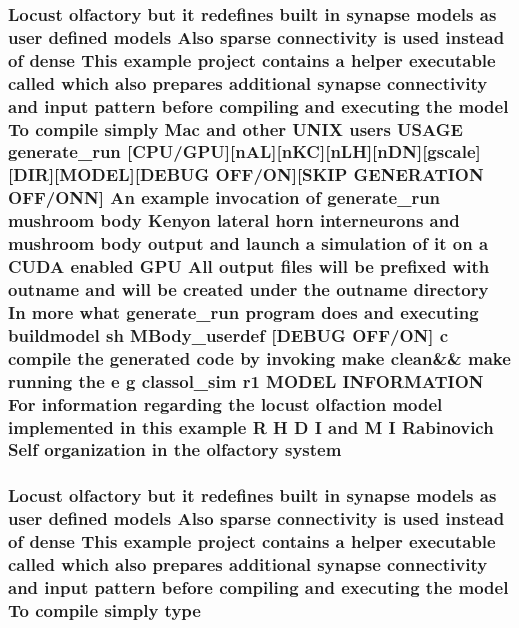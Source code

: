 \hypertarget{userproject_2MBody__userdef__project_2README_8txt_a8944a42451a985d439625b4a2ecdb611}{
\subsubsection[{system}]{\setlength{\rightskip}{0pt plus 5cm}Locust olfactory but {\bf it} redefines built {\bf in} synapse models as user defined models Also sparse connectivity {\bf is} used instead of dense This example {\bf project} contains a helper executable called which also prepares additional synapse connectivity and input pattern before compiling and executing the {\bf model} To compile simply Mac and other U\+N\+I\+X users U\+S\+A\+G\+E {\bf generate\+\_\+run} \mbox{[}{\bf C\+P\+U}/{\bf G\+P\+U}\mbox{]}\mbox{[}n\+A\+L\mbox{]}\mbox{[}n\+K\+C\mbox{]}\mbox{[}n\+L\+H\mbox{]}\mbox{[}n\+D\+N\mbox{]}\mbox{[}gscale\mbox{]}\mbox{[}D\+I\+R\mbox{]}\mbox{[}M\+O\+D\+E\+L\mbox{]}\mbox{[}D\+E\+B\+U\+G O\+F\+F/O\+N\mbox{]}\mbox{[}S\+K\+I\+P G\+E\+N\+E\+R\+A\+T\+I\+O\+N O\+F\+F/O\+N\+N\mbox{]} An example invocation of {\bf generate\+\_\+run} mushroom body Kenyon lateral horn {\bf interneurons} and mushroom body output and launch a simulation of {\bf it} on a C\+U\+D\+A enabled {\bf G\+P\+U} All output files will be prefixed {\bf with} outname and will be created under the outname {\bf directory} In more what {\bf generate\+\_\+run} program does and executing buildmodel sh M\+Body\+\_\+userdef \mbox{[}D\+E\+B\+U\+G O\+F\+F/O\+N\mbox{]} c compile the generated {\bf code} by invoking make clean\&\& make running the e g classol\+\_\+sim r1 M\+O\+D\+E\+L I\+N\+F\+O\+R\+M\+A\+T\+I\+O\+N For information regarding the locust olfaction {\bf model} implemented {\bf in} this example {\bf R} H D I and M I Rabinovich Self organization {\bf in} the olfactory system}}\label{userproject_2MBody__userdef__project_2README_8txt_a8944a42451a985d439625b4a2ecdb611}
\hypertarget{userproject_2MBody__userdef__project_2README_8txt_acaf447a9193df13892d14867971923d5}{
\subsubsection[{type}]{\setlength{\rightskip}{0pt plus 5cm}Locust olfactory but {\bf it} redefines built {\bf in} synapse models as user defined models Also sparse connectivity {\bf is} used instead of dense This example {\bf project} contains a helper executable called which also prepares additional synapse connectivity and input pattern before compiling and executing the {\bf model} To compile simply type}}\label{userproject_2MBody__userdef__project_2README_8txt_acaf447a9193df13892d14867971923d5}

